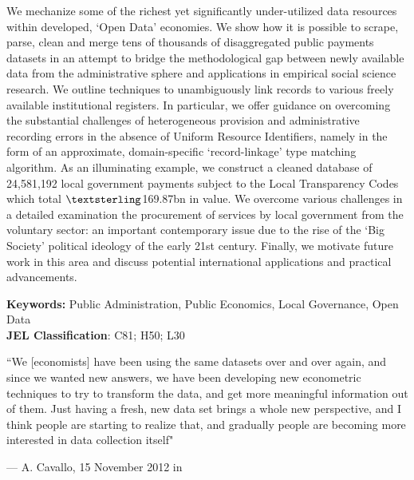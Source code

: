 \documentclass[12pt]{article}
\renewenvironment{abstract}
 {   \linespread{1.2}\selectfont
  \begin{center}
  \bfseries \abstractname\vspace{-.5em}\vspace{0pt}
  \end{center}
  \list{}{%
    \setlength{\leftmargin}{-2.5mm}%
    \setlength{\rightmargin}{\leftmargin}%
  }%
  \item\relax}
 {\endlist}
\begin{document}
\begin{center}

\begin{abstract}
\color{black}
\small{
We mechanize some of the richest yet significantly under-utilized data resources within developed, `Open Data' economies. We show how it is possible to scrape, parse, clean and merge tens of thousands of disaggregated public payments datasets in an attempt to bridge the methodological gap between newly available data from the administrative sphere and applications in empirical social science research. We outline techniques to unambiguously link records to various freely available institutional registers. In particular, we offer guidance on overcoming the substantial challenges of heterogeneous provision and administrative recording errors in the absence of Uniform Resource Identifiers, namely in the form of an approximate, domain-specific `record-linkage' type matching algorithm. As an illuminating example, we construct a cleaned database of 24,581,192 local government payments subject to the Local Transparency Codes which total $\textsterling$169.87bn in value. We overcome various challenges in a detailed examination the procurement of services by local government from the voluntary sector: an important contemporary issue due to the rise of the `Big Society' political ideology of the early 21st century.  Finally, we motivate future work in this area and discuss potential international applications and practical advancements.}
\end{abstract}
\end{center}
\noindent
\textbf{Keywords:} Public Administration, Public Economics, Local Governance, Open Data\\
\noindent
\textbf{JEL Classification}:  C81; H50; L30\\
\newpage
\normalsize
\renewcommand*{\thefootnote}{\arabic{footnote}}
\setlength{\epigraphwidth}{.6\textwidth}
\epigraph{``We [economists] have been using the same datasets over and over again, and since we wanted new answers, we have been developing new econometric techniques to try to transform the data, and get more meaningful information out of them. Just having a fresh, new data set brings a whole new perspective, and I think people are starting to realize that, and gradually people are becoming more interested in data collection itself"}{--- \textup{A. Cavallo, 15 November 2012 in \cite{taylor}}}
\end{document}
